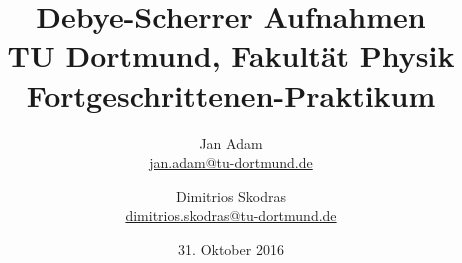



\title{Debye-Scherrer Aufnahmen\\				%
\large TU Dortmund, Fakultät Physik\\ 
\normalsize Fortgeschrittenen-Praktikum}

\author{Jan Adam\\			%
{\small \href{jan.adam@tu-dortmund.de}{jan.adam@tu-dortmund.de}}	%
\and						%
Dimitrios Skodras\\					%
{\small \href{dimitrios.skodras@tu-dortmund.de}{dimitrios.skodras@tu-dortmund.de}}		%
}
\date{31. Oktober 2016}				%





\maketitle					%
\thispagestyle{empty} 				%



\tableofcontents


\newpage					%


